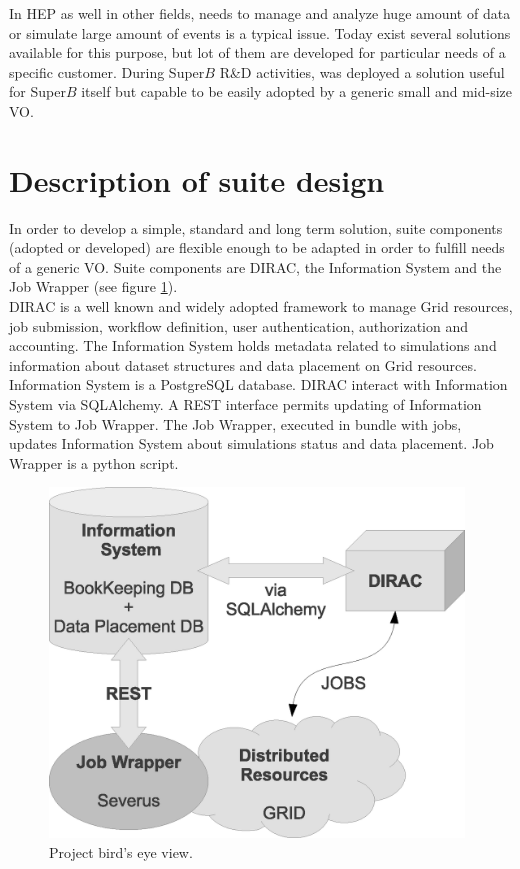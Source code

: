\documentclass[a4paper]{jpconf}
\begin{document}
In HEP as well in other fields, needs to manage and analyze huge amount of data or simulate large amount of events is a typical issue.
Today exist several solutions available for this purpose, but lot of them are developed for particular needs of a specific customer.
During Super$B$ R\&D activities, was deployed a solution useful for Super$B$ itself but capable to be easily adopted by a generic small and mid-size VO.

\section{Description of suite design}

In order to develop a simple, standard and long term solution, suite components (adopted or developed) are flexible enough to be adapted in order to fulfill needs of a generic VO. Suite components are DIRAC, the Information System and the Job Wrapper (see figure \ref{fig:project_bird_eye}).\\
DIRAC is a well known and widely adopted framework to manage Grid resources, job submission, workflow definition, user authentication, authorization and accounting. The Information System holds metadata related to simulations and information about dataset structures and data placement on Grid resources. Information System is a PostgreSQL database. DIRAC interact with Information System via SQLAlchemy. A REST interface permits updating of Information System to Job Wrapper. The Job Wrapper, executed in bundle with jobs, updates Information System about simulations status and data placement. Job Wrapper is a python script.

\begin{figure}[h]
\includegraphics[width=26pc]{img/project_bird_eye.eps}\hspace{2pc}%
\caption{\label{fig:project_bird_eye}Project bird's eye view.}
\end{figure}
\end{document}

